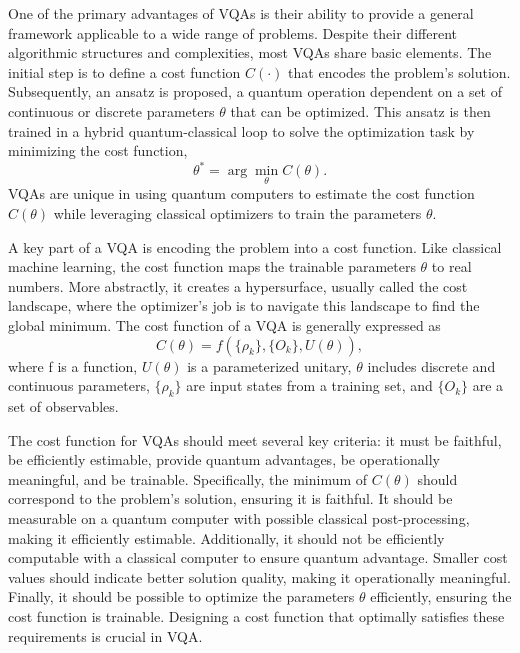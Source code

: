 \documentclass[12pt,dvipdfmx,twoside,openright]{report}
\begin{document}
One of the primary advantages of VQAs is their ability to provide a general framework applicable to a wide range of problems.
Despite their different algorithmic structures and complexities, most VQAs share basic elements.
The initial step is to define a cost function $C(\cdot )$ that encodes the problem's solution. 
Subsequently, an ansatz is proposed, a quantum operation dependent on a set of continuous or discrete parameters $\theta$ that can be optimized. 
This ansatz is then trained in a hybrid quantum-classical loop to solve the optimization task by minimizing the cost function,
\begin{equation}
    \theta^* = \arg \min_\theta C(\theta).
\end{equation}
VQAs are unique in using quantum computers to estimate the cost function $C(\theta)$ while leveraging classical optimizers to train the parameters $\theta$.

A key part of a VQA is encoding the problem into a cost function. 
Like classical machine learning, the cost function maps the trainable parameters $\theta$ to real numbers. 
More abstractly, it creates a hypersurface, usually called the cost landscape, where the optimizer's job is to navigate this landscape to find the global minimum.
The cost function of a VQA is generally expressed as
\begin{equation}
    C(\theta ) = f(\{\rho_k\},\{O_k\},U(\theta)),
\end{equation}
where f is a function, $U(\theta)$ is a parameterized unitary, $\theta$ includes discrete and continuous parameters, $\{\rho_k\}$ are input states from a training set, and $\{O_k\}$ are a set of observables.

The cost function for VQAs should meet several key criteria: it must be faithful, be efficiently estimable, provide quantum advantages, be operationally meaningful, and be trainable.
Specifically, the minimum of $C(\theta )$ should correspond to the problem's solution, ensuring it is faithful.
It should be measurable on a quantum computer with possible classical post-processing, making it efficiently estimable. 
Additionally, it should not be efficiently computable with a classical computer to ensure quantum advantage. 
Smaller cost values should indicate better solution quality, making it operationally meaningful. 
Finally, it should be possible to optimize the parameters $\theta$ efficiently, ensuring the cost function is trainable.
Designing a cost function that optimally satisfies these requirements is crucial in VQA.
\end{document}

